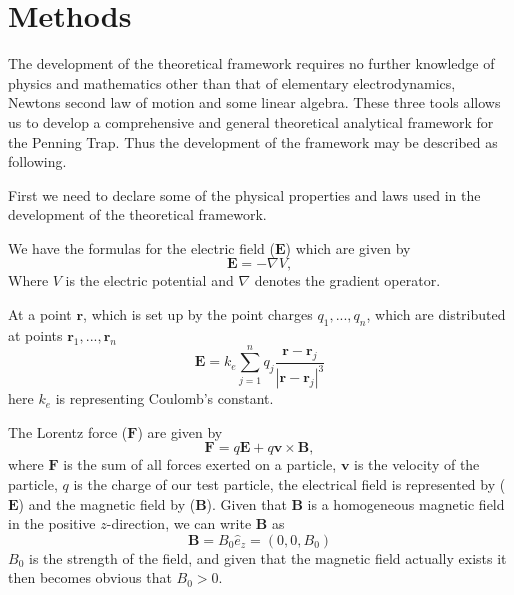 \documentclass[english,notitlepage,reprint,nofootinbib]{revtex4-1}  %
\begin{document}
	\section{Methods}\label{sec:methods}

	The development of the theoretical framework requires no further knowledge of physics and mathematics other than that of elementary electrodynamics, Newtons second law of motion and some linear algebra. These three tools allows us to develop a comprehensive and general theoretical analytical framework for the Penning Trap. Thus the development of the framework may be described as following. 

	First we need to declare some of the physical properties and laws used in the development of the theoretical framework.

	We have the formulas for the electric field ($\mathbf{E}$) which are given by
	\begin{equation} \label{eq:electric field}
		\mathbf{E} = -\nabla V,
	\end{equation}
	Where $V$ is the electric potential and $\nabla$ denotes the gradient operator.
	
	At a point $\mathbf{r}$, which is set up by the point charges ${q_1, ..., q_n}$, which are distributed at points ${\mathbf{r}_1, ..., \mathbf{r}_n}$
	\begin{equation} \label{eq:electric field2}
		\mathbf{E} = k_e \sum_{j=1}^n q_j \frac{\mathbf{r}-\mathbf{r}_j}{|\mathbf{r}-\mathbf{r}_j|^3}
	\end{equation}
	here $k_e$ is representing Coulomb’s constant.

	The Lorentz force ($\mathbf{F}$) are given by
	\begin{equation} \label{eq:Lorentz force}
		\mathbf{F} = q\mathbf{E} + q\mathbf{v}\times \mathbf{B},
	\end{equation}
	where $\mathbf{F}$ is the sum of all forces exerted on a particle, $\mathbf{v}$ is the velocity of the particle, $q$ is the charge of our test particle, the electrical field is represented by ($\mathbf{E}$) and the magnetic field by ($\mathbf{B}$). Given that $\mathbf{B}$ is a homogeneous magnetic field in the positive $z$-direction, we can write $\mathbf{B}$ as
	\begin{equation} \label{eq:Bfield}
		\mathbf{B} = B_0\hat{e}_z = (0, 0, B_0)
	\end{equation}
	$B_0$ is the strength of the field, and given that the magnetic field actually exists it then becomes obvious that $B_0 > 0$.
\end{document}
